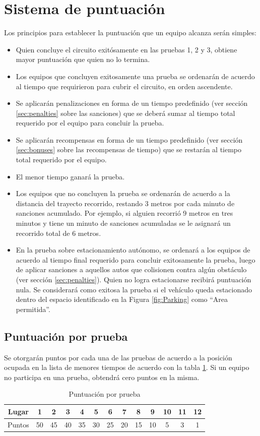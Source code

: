 \documentclass[letterpaper,12pt]{article}
\begin{document}
\section{Sistema de puntuación}
Los principios para establecer la puntuación que un equipo alcanza serán simples:
\begin{itemize}
\item Quien concluye el circuito exitósamente en las pruebas 1, 2 y 3, obtiene mayor puntuación que quien no lo termina.
\item Los equipos que concluyen exitosamente una prueba se ordenarán de acuerdo al tiempo que requirieron para cubrir el circuito, en orden ascendente.
\item Se aplicarán penalizaciones en forma de un tiempo predefinido (ver sección \ref{sec:penalties} sobre las sanciones) que se deberá sumar al tiempo total requerido por el equipo para concluir la prueba.
  \item Se aplicarán recompensas en forma de un tiempo predefinido (ver sección \ref{sec:bonuses} sobre las recompensas de tiempo) que se restarán al tiempo total requerido por el equipo. 
\item El menor tiempo ganará la prueba.
\item Los equipos que no concluyen la prueba se ordenarán de acuerdo a la distancia del trayecto recorrido, restando 3 metros por cada minuto de sanciones acumulado. Por ejemplo, si alguien recorrió 9 metros en tres minutos y tiene un minuto de sanciones acumuladas se le asignará un recorrido total de 6 metros.
\item En la prueba sobre estacionamiento autónomo, se ordenará a los equipos de acuerdo al tiempo final requerido para concluir exitosamente la prueba, luego de aplicar sanciones a aquellos autos que colisionen contra algún obstáculo (ver sección \ref{sec:penalties}). Quien no logra estacionarse recibirá puntuación nula. Se considerará como exitosa la prueba si el vehículo queda estacionado dentro del espacio identificado en la Figura \ref{fig:Parking} como “Area permitida”.
\end{itemize}

\subsection{Puntuación por prueba}
\label{sec:scoring}
Se otorgarán puntos por cada una de las pruebas de acuerdo a la posición ocupada en la lista de menores tiempos de acuerdo con la tabla \ref{tab:Scoring}. Si un equipo no participa en una prueba, obtendrá cero puntos en la misma.
\[\]
\begin{table}[h!] 
  \centering
  \begin{tabular}{|c|c|c|c|c|c|c|c|c|c|c|c|c|}
    \hline
    Lugar &    1&   2&   3&   4&   5&   6&   7&   8&   9&10 & 11 & 12\\
    \hline
    Puntos & 50 & 45 & 40 & 35 & 30 & 25 & 20 & 15 & 10 & 5 & 3 & 1\\
    \hline
  \end{tabular}
  \caption{Puntuación por prueba}
  \label{tab:Scoring}
\end{table}
\end{document}
